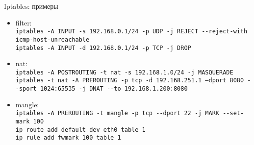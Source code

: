 \begin{frame}{Iptables: примеры}

	\small
	\begin{itemize}
		\item filter:\\
			{\tt iptables -A INPUT -s 192.168.0.1/24 -p UDP -j REJECT -{}-reject-with icmp-host-unreachable}\\
			{\tt iptables -A INPUT -d 192.168.0.1/24 -p TCP -j DROP}
		\item nat:\\
			{\tt iptables -A POSTROUTING -t nat -s 192.168.1.0/24 -j MASQUERADE}\\
			{\tt iptables -t nat -A PREROUTING -p tcp -d 192.168.251.1 
			--dport 8080 -{}-sport 1024:65535 -j DNAT -{}-to 192.168.1.200:8080}
		\item mangle:\\
			{\tt iptables -A PREROUTING -t mangle -p tcp -{}-dport 22 -j MARK -{}-set-mark 100}\\
			{\tt ip route add default dev eth0 table 1}\\
			{\tt ip rule add fwmark 100 table 1}
	\end{itemize}

\end{frame}

